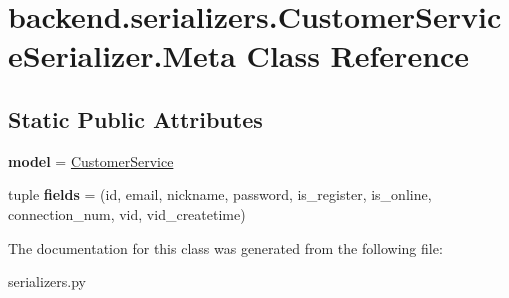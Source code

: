 \hypertarget{classbackend_1_1serializers_1_1_customer_service_serializer_1_1_meta}{}\section{backend.\+serializers.\+Customer\+Service\+Serializer.\+Meta Class Reference}
\label{classbackend_1_1serializers_1_1_customer_service_serializer_1_1_meta}
\subsection*{Static Public Attributes}
\begin{DoxyCompactItemize}
\item 
\mbox{\label{classbackend_1_1serializers_1_1_customer_service_serializer_1_1_meta_a37c677b65630698219d4783021068c22}} 
{\bfseries model} = \hyperlink{classbackend_1_1models_1_1_customer_service}{Customer\+Service}
\item 
\mbox{\label{classbackend_1_1serializers_1_1_customer_service_serializer_1_1_meta_a136971cbeacbcde4b66040534539ed35}} 
tuple {\bfseries fields} = (\textquotesingle{}id\textquotesingle{}, \textquotesingle{}email\textquotesingle{}, \textquotesingle{}nickname\textquotesingle{}, \textquotesingle{}password\textquotesingle{}, \textquotesingle{}is\+\_\+register\textquotesingle{}, \textquotesingle{}is\+\_\+online\textquotesingle{}, \textquotesingle{}connection\+\_\+num\textquotesingle{}, \textquotesingle{}vid\textquotesingle{}, \textquotesingle{}vid\+\_\+createtime\textquotesingle{})
\end{DoxyCompactItemize}


The documentation for this class was generated from the following file\+:\begin{DoxyCompactItemize}
\item 
serializers.\+py\end{DoxyCompactItemize}

